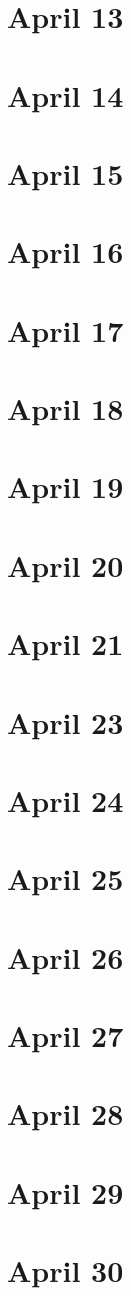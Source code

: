 \section{April 13}

\section{April 14}

\section{April 15}

\section{April 16}

\section{April 17}

\section{April 18}

\section{April 19}

\section{April 20}

\section{April 21}

\section{April 23}

\section{April 24}

\section{April 25}

\section{April 26}

\section{April 27}

\section{April 28}

\section{April 29}

\section{April 30}

